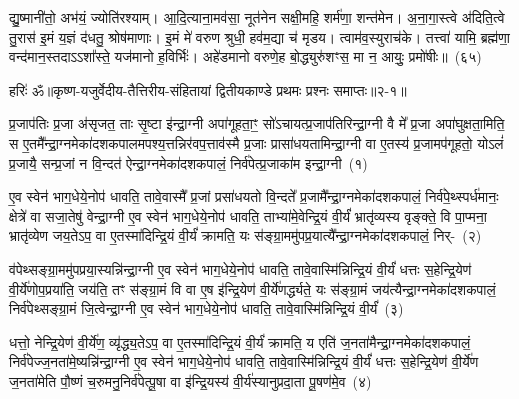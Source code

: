 द्यु॒ष्मानी॑तो॒ अभ॑यं॒ ज्योति॑रश्याम्। आ॒दि॒त्याना॒मव॑सा॒ नूत॑नेन सक्षी॒महि॒ शर्म॑णा॒ शन्त॑मेन। अ॒ना॒गा॒स्त्वे अ॑दिति॒त्वे तु॒रास॑ इ॒मं य॒ज्ञं द॑धतु॒ श्रोष॑माणाः। इ॒मं मे॑ वरुण श्रुधी॒ हव॑म॒द्या च॑ मृडय। त्वाम॑व॒स्युराच॑के। तत्त्वा॑ यामि॒ ब्रह्म॑णा॒ वन्द॑मान॒स्तदा\-ऽऽ\-शा᳚स्ते॒ यज॑मानो ह॒विर्भिः॑। अहे॑डमानो वरुणे॒ह बो॒द्ध्युरु॑शꣳस॒ मा न॒ आयुः॒ प्रमो॑षीः॥~(६५)\ip

{\anuvakamend[{नामा॒ग्निः सꣳ शव॑सो॒ रक्ष॑माणा धी॒र्या॑चि॒देका॒न्नप॑ञ्चा॒शच्च॑}]}%

{हरिः॑ ॐ}{॥कृष्ण-यजुर्वेदीय-तैत्तिरीय-संहितायां द्वितीयकाण्डे प्रथमः प्रश्नः समाप्तः॥२-१॥}



\setcounter{anuvakam}{0}
प्र॒जा\-प॑तिः प्र॒जा अ॑सृजत॒ ताः सृ॒ष्टा इ॑न्द्रा॒ग्नी अपा॑गूहता॒ꣳ॒ सो॑\-ऽचायत्प्र॒जा\-प॑तिरिन्द्रा॒ग्नी वै मे᳚ प्र॒जा अपा॑घुक्षता॒मिति॒ स ए॒तमै᳚न्द्रा॒ग्नमेका॑\-दश\-कपालमपश्य॒त्तन्निर॑वप॒त्ताव॑स्मै प्र॒जाः प्रासा॑धयतामिन्द्रा॒ग्नी वा ए॒तस्य॑ प्र॒जामप॑गूहतो॒ यो\-ऽलं॑ प्र॒जायै॒ सन्प्र॒जां न वि॒न्दत॑ ऐन्द्रा॒ग्नमेका॑\-दश\-कपालं॒ निर्व॑पेत्प्र॒जाका॑म इन्द्रा॒ग्नी~(१)\ip

ए॒व स्वेन॑ भाग॒\-धेये॒नोप॑ धावति॒ तावे॒वास्मै᳚ प्र॒जां प्रसा॑धयतो वि॒न्दते᳚ प्र॒जामै᳚न्द्रा॒ग्नमेका॑\-दश\-कपालं॒ निर्व॑पे॒थ्स्पर्ध॑मानः॒ क्षेत्रे॑ वा सजा॒तेषु॑ वेन्द्रा॒ग्नी ए॒व स्वेन॑ भाग॒\-धेये॒नोप॑ धावति॒ ताभ्या॑मे॒वेन्द्रि॒यं वी॒र्यं॑ भ्रातृ॑व्यस्य वृङ्क्ते॒ वि पा॒प्मना॒ भ्रातृ॑व्येण जय॒ते\-ऽप॒ वा ए॒तस्मा॑दिन्द्रि॒यं वी॒र्यं॑ क्रामति॒ यः स॑ङ्ग्रा॒ममु॑पप्र॒यात्यै᳚न्द्रा॒ग्नमेका॑\-दश\-कपालं॒ निर्-~(२)\ip

व॑पेथ्सङ्ग्रा॒ममु॑पप्रया॒स्यन्नि॑न्द्रा॒ग्नी ए॒व स्वेन॑ भाग॒\-धेये॒नोप॑ धावति॒ तावे॒वास्मि॑न्निन्द्रि॒यं वी॒र्यं॑ धत्तः स॒हेन्द्रि॒येण॑ वी॒र्ये॑णोप॒प्रया॑ति॒ जय॑ति॒ तꣳ स॑ङ्ग्रा॒मं वि वा ए॒ष इ॑न्द्रि॒येण॑ वी॒र्ये॑णर्द्ध्यते॒ यः स॑ङ्ग्रा॒मं जय॑त्यैन्द्रा॒ग्नमेका॑\-दश\-कपालं॒ निर्व॑पेथ्सङ्ग्रा॒मं जि॒त्वेन्द्रा॒ग्नी ए॒व स्वेन॑ भाग॒\-धेये॒नोप॑ धावति॒ तावे॒वास्मि॑न्निन्द्रि॒यं वी॒र्यं॑~(३)\ip

धत्तो॒ नेन्द्रि॒येण॑ वी॒र्ये॑ण॒ व्यृ॑द्ध्य॒ते\-ऽप॒ वा ए॒तस्मा॑दिन्द्रि॒यं वी॒र्यं॑ क्रामति॒ य एति॑ ज॒नता॑मैन्द्रा॒ग्नमेका॑\-दश\-कपालं॒ निर्व॑पेज्ज॒नता॑\-मे॒ष्यन्नि॑न्द्रा॒ग्नी ए॒व स्वेन॑ भाग॒\-धेये॒नोप॑ धावति॒ तावे॒वास्मि॑न्निन्द्रि॒यं वी॒र्यं॑ धत्तः स॒हेन्द्रि॒येण॑ वी॒र्ये॑ण ज॒नता॑मेति पौ॒ष्णं च॒रुमनु॒निर्व॑पेत्पू॒षा वा इ॑न्द्रि॒यस्य॑ वी॒र्य॑स्यानुप्रदा॒ता पू॒षण॑मे॒व~(४)\ip

